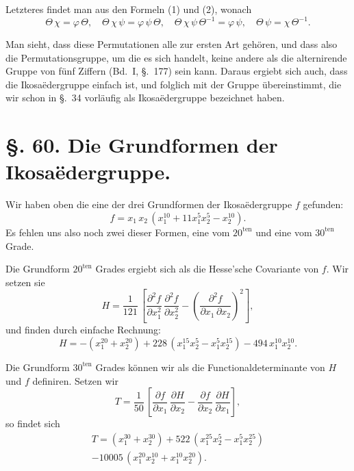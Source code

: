 \documentclass[12pt,a4paper]{article}
\theoremstyle{plain}
\theoremstyle{definition}
\theoremstyle{remark}
\begin{document}
Letzteres findet man aus den Formeln (1) und (2), wonach
\[
\Theta\,\chi = \varphi\,\Theta,\quad \Theta\,\chi\,\psi = \varphi\,\psi\,\Theta,\quad \Theta\,\chi\,\psi\,\Theta^{-1} = \varphi\,\psi,\quad \Theta\,\psi = \chi\,\Theta^{-1}.
\]

Man sieht, dass diese Permutationen alle zur ersten Art geh\"oren, und dass also die Permutationsgruppe, um die es sich handelt, keine andere als die alternirende Gruppe von f\"unf Ziffern (Bd.~I, \S.~177) sein kann. Daraus ergiebt sich auch, dass die Ikosa\"edergruppe einfach ist, und folglich mit der Gruppe \"ubereinstimmt, die wir schon in \S.~34 vorl\"aufig als Ikosa\"edergruppe bezeichnet haben.


\section*{\S. 60. Die Grundformen der Ikosa\"edergruppe.}

Wir haben oben die eine der drei Grundformen der Ikosa\"edergruppe $f$ gefunden:
\begin{equation}\tag{1}
f = x_{1}\,x_{2}\,(x_{1}^{10} + 11x_{1}^{5}x_{2}^{5} - x_{2}^{10}).
\end{equation}
Es fehlen uns also noch zwei dieser Formen, eine vom $20^{\text{ten}}$ und eine vom $30^{\text{ten}}$ Grade.

Die Grundform $20^{\text{ten}}$ Grades ergiebt sich als die Hesse'sche Covariante von $f$. Wir setzen sie
\begin{equation}\tag{2}
H = \frac{1}{121}\,\left[\frac{\partial^{2}f}{\partial x_{1}^{2}}\,\frac{\partial^{2}f}{\partial x_{2}^{2}} - \left(\frac{\partial^{2}f}{\partial x_{1}\,\partial x_{2}}\right)^{2}\right],
\end{equation}
und finden durch einfache Rechnung:
\begin{equation}\tag{3}
H = -(x_{1}^{20} + x_{2}^{20}) + 228\,(x_{1}^{15}x_{2}^{5} - x_{1}^{5}x_{2}^{15}) - 494\,x_{1}^{10}x_{2}^{10}.
\end{equation}

Die Grundform $30^{\text{ten}}$ Grades k\"onnen wir als die Functionaldeterminante von $H$ und $f$ definiren. Setzen wir
\begin{equation}\tag{4}
T = \frac{1}{50}\,\left[\frac{\partial f}{\partial x_{1}}\,\frac{\partial H}{\partial x_{2}} - \frac{\partial f}{\partial x_{2}}\,\frac{\partial H}{\partial x_{1}}\right],
\end{equation}
so findet sich
\begin{multline}\tag{5}
T = (x_{1}^{30} + x_{2}^{30}) + 522\,(x_{1}^{25}x_{2}^{5} - x_{1}^{5}x_{2}^{25}) \\
- 10005\,(x_{1}^{20}x_{2}^{10} + x_{1}^{10}x_{2}^{20}).
\end{multline}
\end{document}
